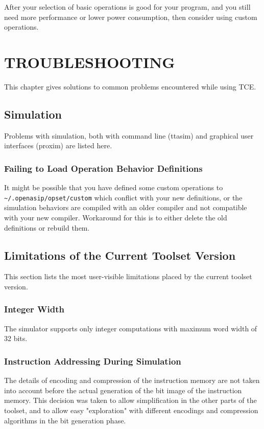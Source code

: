 \documentclass[a4paper,twoside]{tceusermanual}
\begin{document}
After your selection of basic operations is good for your program, and you still 
need more performance or lower power consumption, then consider using custom 
operations. 

\chapter{TROUBLESHOOTING}
\label{chapter:troubleshooting}

This chapter gives solutions to common problems encountered while using TCE.

\section{Simulation}

Problems with simulation, both with command line (ttasim) and graphical
user interfaces (proxim) are listed here.

\subsection{Failing to Load Operation Behavior Definitions}

It might be possible that you have defined some custom operations to
\verb|~/.openasip/opset/custom| which conflict with your new definitions, or the
simulation behaviors are compiled with an older compiler and not compatible
with your new compiler. Workaround for this is to either delete the old
definitions or rebuild them.

\section{Limitations of the Current Toolset Version}

This section lists the most user-visible limitations placed by the current
toolset version.

\subsection{Integer Width}

The simulator supports only integer computations with maximum word width of
32 bits. 

\subsection{Instruction Addressing During Simulation}

The details of encoding and compression of the instruction memory are not
taken into account before the actual generation of the bit image of the
instruction memory. This decision was taken to allow simplification in the
other parts of the toolset, and to allow easy "exploration" with different
encodings and compression algorithms in the bit generation phase.
\end{document}
